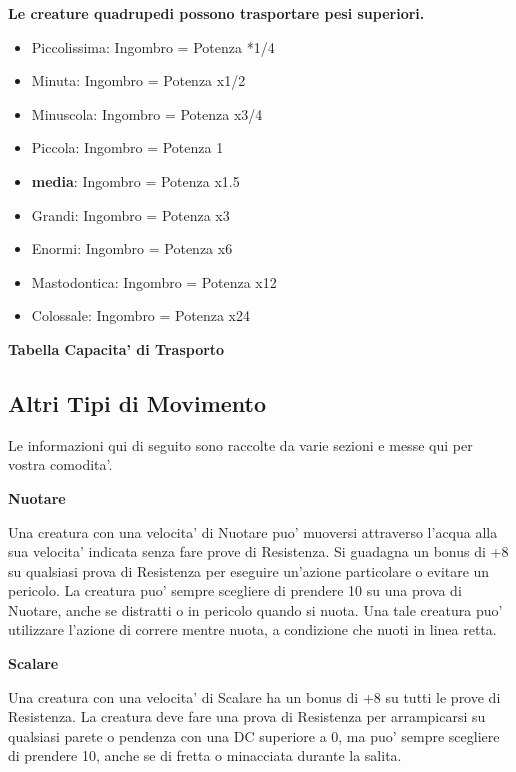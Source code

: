 \documentclass[a4paper,11pt,twoside,openany]{book}
\begin{document}
{\bigskip


\textbf{Le creature quadrupedi possono trasportare pesi superiori. }


\begin{itemize}
	\item Piccolissima: Ingombro = Potenza *1/4
	\item Minuta: Ingombro = Potenza x1/2
	\item Minuscola: Ingombro = Potenza x3/4
	\item Piccola: Ingombro = Potenza 1
	\item \textbf{media}: Ingombro = Potenza x1.5
	\item Grandi: Ingombro = Potenza x3
	\item Enormi: Ingombro = Potenza x6
	\item Mastodontica: Ingombro = Potenza x12
	\item Colossale: Ingombro = Potenza x24
\end{itemize}

\bigskip

\textbf{Tabella Capacita' di Trasporto}


\subsection{Altri Tipi di Movimento}

\label{altri-tipi-di-movimento}

Le informazioni qui di seguito sono raccolte da varie sezioni e messe
qui per vostra comodita'.

\textbf{Nuotare}

Una creatura con una velocita' di Nuotare puo' muoversi attraverso l'acqua alla sua velocita' indicata senza fare prove di Resistenza. Si guadagna un bonus di +8 su qualsiasi prova di Resistenza per eseguire un'azione particolare o evitare un pericolo. La creatura puo' sempre scegliere di prendere 10 su una prova di Nuotare, anche se distratti o in pericolo quando si nuota. Una tale creatura puo' utilizzare l'azione di correre mentre nuota, a condizione che nuoti in linea retta.

\textbf{Scalare}

Una creatura con una velocita' di Scalare ha un bonus di +8 su tutti le prove di Resistenza. La creatura deve fare una prova di Resistenza per arrampicarsi su qualsiasi parete o pendenza con una DC superiore a 0, ma puo' sempre scegliere di prendere 10, anche se di fretta o minacciata durante la salita.

}
\end{document}
